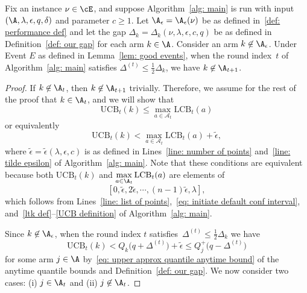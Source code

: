 \begin{lemma}
\label{lem: elim suboptimal}
     Fix an instance $\nu \in \cE$, and suppose Algorithm~\ref{alg: main} is run with input $(\A, \lambda, \epsilon, q, \delta)$ and parameter $c \ge 1$.
    Let $\A_{\epsilon} = \A_{\epsilon}(\nu) $ be as defined in~\eqref{def: performance def} and let the gap $\Delta_{k} = \Delta_{k}(\nu, \lambda, \epsilon, c, q)$ be as defined in Definition~\ref{def: our gap} 
    for each arm $k \in \A$.
    Consider an arm $k \not\in \A_{\epsilon}$.
    Under Event $E$ as defined in Lemma~\ref{lem: good events}, when the round index~$t$
    of Algorithm~\ref{alg: main} satisfies $\Delta^{(t)}  \le \frac{1}{2} \Delta_k$, we have  $k \not\in \A_{t+1}$.
\end{lemma}
\begin{proof}
    If $k \not\in \A_t$, then $k \not\in \A_{t+1}$ trivially. Therefore, we assume for the rest of the proof that $k \in \A_t$, and we will show that
    \begin{equation}
    \label{eq: eliminate condition}
        \mathrm{UCB}_t(k) \le \max\limits_{a \in \mathcal{A}_{t}} \mathrm{LCB}_t(a)
    \end{equation}
    or equivalently
    \begin{equation}
    \label{eq: eliminate condition equivalent}
        \mathrm{UCB}_t(k) < \max\limits_{a \in \mathcal{A}_{t}} \mathrm{LCB}_t(a) + \tilde{\epsilon},
    \end{equation}
    where $\tilde{\epsilon} = \tilde{\epsilon}(\lambda, \epsilon, c)$ is as defined in Lines~\ref{line: number of points} and~\ref{line: tilde epsilon} of Algorithm~\ref{alg: main}.
    Note that these conditions are equivalent because both
    $\mathrm{UCB}_t(k)$ and
    $\max\limits_{a \in \A_t } \mathrm{LCB}_t(a)$ 
    are elements of 
    \begin{equation}
        \left[ 0, 
        \tilde{\epsilon}, 
        2\tilde{\epsilon}, \cdots,
        (n-1) \tilde{\epsilon}, \lambda\right],
    \end{equation}
   which follows from Lines~\ref{line: list of points},~\ref{eq: initiate default conf interval}, and~\ref{ltk def}--\ref{UCB definition} of Algorithm~\ref{alg: main}.

    
    Since $k \not\in \A_{\epsilon}$, when the round index $t$ satisfies~$\Delta^{(t)} \le \frac{1}{2} \Delta_k $ we have
    \begin{equation}
    \label{eq: gap k realized with arm j}
        \mathrm{UCB}_t(k)
        < Q_k \big( q + \Delta^{(t)} \big)  + \tilde{\epsilon} 
        \le Q^+_{j}\big(q - \Delta^{(t)} \big) 
    \end{equation}
    for some arm $j \in \A$  by~\eqref{eq: upper approx quantile anytime bound} of the anytime quantile bounds
    and Definition~\ref{def: our gap}. 
    We now consider two cases: (i) $j \in \A_t$ and (ii) $j \not\in \A_t$.


\end{proof}

